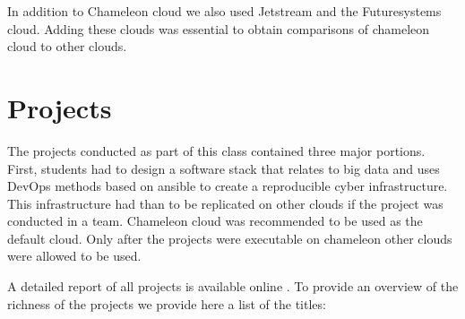 \documentclass[sigconf]{acmart}
\begin{document}
In addition to Chameleon cloud we also used Jetstream and the
Futuresystems cloud. Adding these clouds was essential to obtain
comparisons of chameleon cloud to other clouds.

\section{Projects}

The projects conducted as part of this class contained three major
portions. First, students had to design a software stack that relates
to big data and uses DevOps methods based on ansible to create a
reproducible cyber infrastructure. This infrastructure had than to be
replicated on other clouds if the project was conducted in a
team. Chameleon cloud was recommended to be used as the default
cloud. Only after the projects were executable on chameleon other
clouds were allowed to be used. 

A detailed report of all projects is available online \cite{www-las-i524-sp17}. To
provide an overview of the richness of the projects we provide here a
list of the titles:
\end{document}

